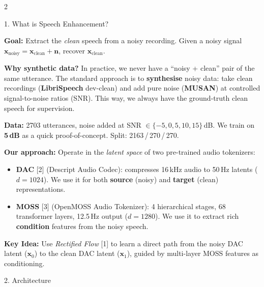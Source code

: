\documentclass[a3paper,landscape,10pt]{article}
\begin{document}
\begin{multicols}{2}

\begin{sectionbox}{1. What is Speech Enhancement?}

\textbf{Goal:} Extract the \emph{clean} speech from a noisy recording. Given a noisy signal $\mathbf{x}_\text{noisy} = \mathbf{x}_\text{clean} + \mathbf{n}$, recover $\mathbf{x}_\text{clean}$.

\textbf{Why synthetic data?} In practice, we never have a ``noisy + clean'' pair of the same utterance. The standard approach is to \textbf{synthesise} noisy data: take clean recordings (\textbf{LibriSpeech} dev-clean) and add pure noise (\textbf{MUSAN}) at controlled signal-to-noise ratios (SNR). This way, we always have the ground-truth clean speech for supervision.

\textbf{Data:} 2703 utterances, noise added at SNR $\in \{-5, 0, 5, 10, 15\}$\,dB. We train on \textbf{5\,dB} as a quick proof-of-concept. Split: 2163\,/\,270\,/\,270.

\textbf{Our approach:} Operate in the \emph{latent space} of two pre-trained audio tokenizers:
\begin{itemize}[leftmargin=10pt,itemsep=0pt,topsep=1pt]
  \item \textbf{DAC} [2] (Descript Audio Codec): compresses 16\,kHz audio to 50\,Hz latents ($d\!=\!1024$). We use it for both \textbf{source} (noisy) and \textbf{target} (clean) representations.
  \item \textbf{MOSS} [3] (OpenMOSS Audio Tokenizer): 4 hierarchical stages, 68 transformer layers, 12.5\,Hz output ($d\!=\!1280$). We use it to extract rich \textbf{condition} features from the noisy speech.
\end{itemize}

\begin{highlightbox}
\textbf{Key Idea:} Use \emph{Rectified Flow} [1] to learn a direct path from the noisy DAC latent ($\mathbf{x}_0$) to the clean DAC latent ($\mathbf{x}_1$), guided by multi-layer MOSS features as conditioning.
\end{highlightbox}

\end{sectionbox}

\vspace{-2pt}

\begin{sectionbox}{2. Architecture}


\end{sectionbox}
\end{multicols}
\end{document}
